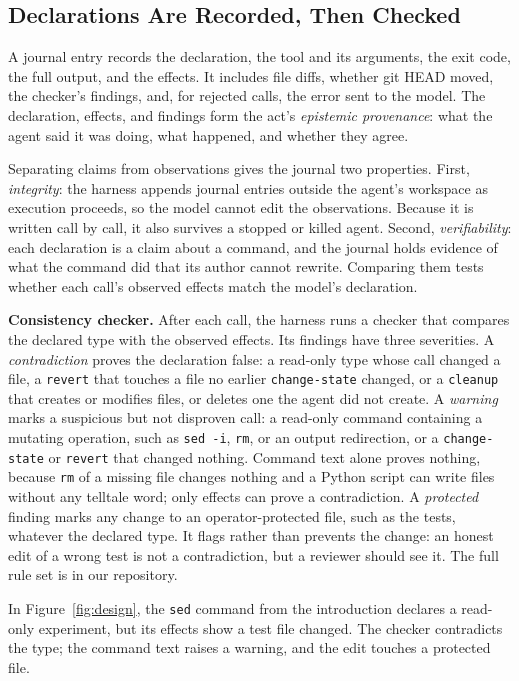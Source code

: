 \documentclass{IEEEcsmag}
\begin{document}
\subsection{Declarations Are Recorded, Then Checked}

A journal entry records the declaration, the tool and its arguments, the exit code, the full output, and the effects. It includes file diffs, whether git HEAD moved, the checker's findings, and, for rejected calls, the error sent to the model. The declaration, effects, and findings form the act's \emph{epistemic provenance}: what the agent said it was doing, what happened, and whether they agree.

Separating claims from observations gives the journal two properties.
First, \emph{integrity}: the harness appends journal entries outside the agent's workspace as execution proceeds, so the model cannot edit the observations. Because it is written call by call, it also survives a stopped or killed agent.
Second, \emph{verifiability}: each declaration is a claim about a command, and the journal holds evidence of what the command did that its author cannot rewrite. Comparing them tests whether each call's observed effects match the model's declaration.


\textbf{Consistency checker.} After each call, the harness runs a checker that compares the declared type with the observed effects. Its findings have three severities.
A \emph{contradiction} proves the declaration false: a read-only type whose call changed a file, a \texttt{revert} that touches a file no earlier \texttt{change-state} changed, or a \texttt{cleanup} that creates or modifies files, or deletes one the agent did not create.
A \emph{warning} marks a suspicious but not disproven call: a read-only command containing a mutating operation, such as \texttt{sed -i}, \texttt{rm}, or an output redirection, or a \texttt{change-state} or \texttt{revert} that changed nothing. Command text alone proves nothing, because \texttt{rm} of a missing file changes nothing and a Python script can write files without any telltale word; only effects can prove a contradiction.
A \emph{protected} finding marks any change to an operator-protected file, such as the tests, whatever the declared type. It flags rather than prevents the change: an honest edit of a wrong test is not a contradiction, but a reviewer should see it.
The full rule set is in our repository.

In Figure~\ref{fig:design}, the \texttt{sed} command from the introduction declares a read-only experiment, but its effects show a test file changed. The checker contradicts the type; the command text raises a warning, and the edit touches a protected file.
\end{document}
